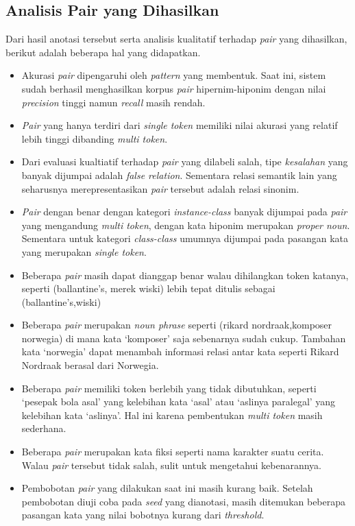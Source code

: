 \subsection{Analisis Pair yang Dihasilkan}
Dari hasil anotasi tersebut serta analisis kualitatif terhadap \textit{pair} yang dihasilkan, berikut adalah beberapa hal yang didapatkan.
\begin{itemize} 
  \item Akurasi \textit{pair} dipengaruhi oleh \textit{pattern} yang membentuk. Saat ini, sistem sudah berhasil menghasilkan korpus \textit{pair} hipernim-hiponim dengan nilai \textit{precision} tinggi namun \textit{recall} masih rendah.
  \item \textit{Pair} yang hanya terdiri dari \textit{single token} memiliki nilai akurasi yang relatif lebih tinggi dibanding \textit{multi token}.
  \item Dari evaluasi kualtiatif terhadap \textit{pair} yang dilabeli salah, tipe \textit{kesalahan} yang banyak dijumpai adalah \textit{false relation}. Sementara relasi semantik lain yang seharusnya merepresentasikan \textit{pair} tersebut adalah relasi sinonim.
  \item \textit{Pair} dengan benar dengan kategori \textit{instance-class} banyak dijumpai pada \textit{pair} yang mengandung \textit{multi token}, dengan kata hiponim merupakan \textit{proper noun}. Sementara untuk kategori \textit{class-class} umumnya dijumpai pada pasangan kata yang merupakan \textit{single token}. 
  \item Beberapa \textit{pair} masih dapat dianggap benar walau dihilangkan token katanya, seperti (ballantine's, merek wiski) lebih tepat ditulis sebagai (ballantine's,wiski)
  \item Beberapa \textit{pair} merupakan \textit{noun phrase} seperti (rikard nordraak,komposer norwegia) di mana kata `komposer' saja sebenarnya sudah cukup. Tambahan kata `norwegia' dapat menambah informasi relasi antar kata seperti Rikard Nordraak berasal dari Norwegia.
  \item Beberapa \textit{pair} memiliki token berlebih yang tidak dibutuhkan, seperti `pesepak bola asal' yang kelebihan kata `asal' atau `aslinya paralegal' yang kelebihan kata `aslinya'. Hal ini karena pembentukan \textit{multi token} masih sederhana. 
  \item Beberapa \textit{pair} merupakan kata fiksi seperti nama karakter suatu cerita. Walau \textit{pair} tersebut tidak salah, sulit untuk mengetahui kebenarannya.
  \item Pembobotan \textit{pair} yang dilakukan saat ini masih kurang baik. Setelah pembobotan diuji coba pada \textit{seed} yang dianotasi, masih ditemukan beberapa pasangan kata yang nilai bobotnya kurang dari \textit{threshold}. 
\end{itemize}

